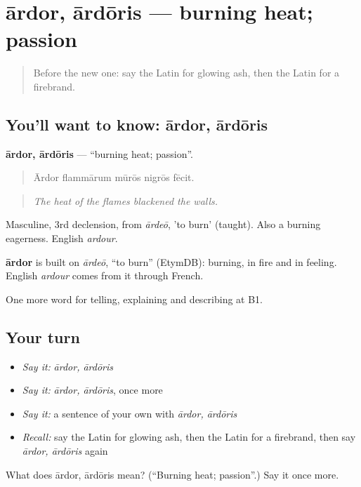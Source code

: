\section[ārdor, ārdōris]{ārdor, ārdōris — burning heat; passion}

\label{lesson:LA-C317-ardor}



\begin{quote}
Before the new one: say the Latin for glowing ash, then the Latin for a firebrand.
\end{quote}

\subsection*{You'll want to know: ārdor, ārdōris}
\textbf{ārdor, ārdōris} — \textquotedblleft{}burning heat; passion\textquotedblright{}.

\begin{quote}
Ārdor flammārum mūrōs nigrōs fēcit.
\end{quote}

\begin{quote}
\emph{The heat of the flames blackened the walls.}
\end{quote}

Masculine, 3rd declension, from \emph{ārdeō}, 'to burn' (taught). Also a burning eagerness. English \emph{ardour}.

\begin{cousinweb}
\textbf{ārdor} is built on \emph{ārdeō}, \textquotedblleft{}to burn\textquotedblright{} (EtymDB): burning, in fire and in feeling. English \emph{ardour} comes from it through French.
\end{cousinweb}

\begin{grammarlens}[title={What you've built}]
One more word for telling, explaining and describing at B1.
\end{grammarlens}

\subsection*{Your turn}
\begin{itemize}
\raggedright
  \item \emph{Say it:} \emph{ārdor, ārdōris}
  \item \emph{Say it:} \emph{ārdor, ārdōris}, once more
  \item \emph{Say it:} a sentence of your own with \emph{ārdor, ārdōris}
  \item \emph{Recall:} say the Latin for glowing ash, then the Latin for a firebrand, then say \emph{ārdor, ārdōris} again
\end{itemize}

\begin{tcolorbox}[breakable,colback=teal!4,colframe=teal!35!black,title={Before you move on}]
What does ārdor, ārdōris mean? (\textquotedblleft{}Burning heat; passion\textquotedblright{}.) Say it once more.
\end{tcolorbox}
